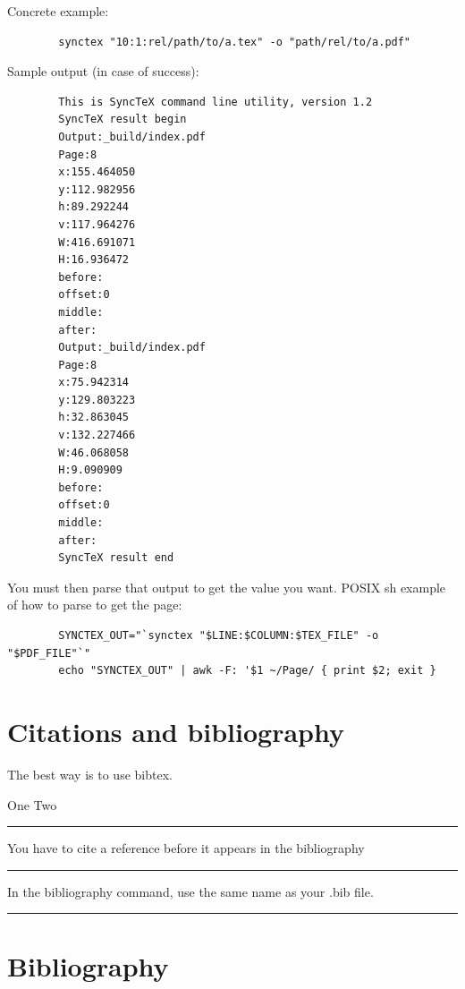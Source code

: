 \documentclass[12pt]{article}
\newcommand{\inOut}[1]{#1}                                %
\begin{document}
    Concrete example:

    \begin{lstlisting}
        synctex "10:1:rel/path/to/a.tex" -o "path/rel/to/a.pdf"
    \end{lstlisting}

    Sample output (in case of success):

    \begin{lstlisting}
        This is SyncTeX command line utility, version 1.2
        SyncTeX result begin
        Output:_build/index.pdf
        Page:8
        x:155.464050
        y:112.982956
        h:89.292244
        v:117.964276
        W:416.691071
        H:16.936472
        before:
        offset:0
        middle:
        after:
        Output:_build/index.pdf
        Page:8
        x:75.942314
        y:129.803223
        h:32.863045
        v:132.227466
        W:46.068058
        H:9.090909
        before:
        offset:0
        middle:
        after:
        SyncTeX result end
    \end{lstlisting}

    You must then parse that output to get the value you want.
    POSIX sh example of how to parse to get the page:

    \begin{lstlisting}
        SYNCTEX_OUT="`synctex "$LINE:$COLUMN:$TEX_FILE" -o "$PDF_FILE"`"
        echo "SYNCTEX_OUT" | awk -F: '$1 ~/Page/ { print $2; exit }
    \end{lstlisting}

\section{Citations and bibliography}\label{secCit}

    The best way is to use bibtex.

    \begin{example} \label{expCite1}
        \inOut{One \cite{Aa01} Two \cite{LL01}}
    \end{example}\hrule

    \begin{remark} \label{remCite1}
        You have to cite a reference before it appears in the bibliography
    \end{remark}\hrule

    \begin{remark} \label{remCite2}
        In the bibliography command, use the same name as your .bib file.
    \end{remark}\hrule

\section{Bibliography}\label{secBib}

    \newpage
    
\end{document}
